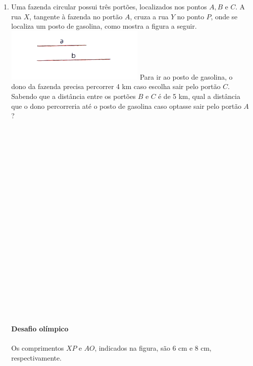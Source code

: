 \documentclass[a4paper,14pt]{article}
\begin{document}
\begin{multicols}{2}
\begin{enumerate}
    		\newpage
    		\item Uma fazenda circular possui três portões, localizados nos pontos $A, B$ e $C$. A rua $X$, tangente à fazenda no portão $A$, cruza a rua $Y$ no ponto $P$, onde se localiza um posto de gasolina, como mostra a figura a seguir. \\
    		\includegraphics[width=1\linewidth]{imagens_8FMA110/imagem5}
    		Para ir ao posto de gasolina, o dono da fazenda precisa percorrer 4 km caso escolha sair pelo portão $C$. Sabendo que a distância entre os portões $B$ e $C$ é de 5 km, qual a distância que o dono percorreria até o posto de gasolina caso optasse sair pelo portão $A$? \\\\\\\\\\\\\\\\\\\\\\\\\\\\\\\\\\\\\\\\\\\\
    		\textbf{Desafio olímpico} \\\\
    		Os comprimentos $XP$ e $AO$, indicados na figura, são 6 cm e 8 cm, respectivamente. \\

\end{enumerate}
\end{multicols}
\end{document}
